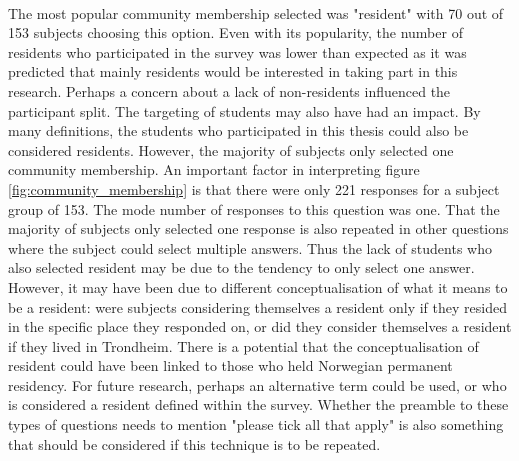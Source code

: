 \paragraph{}
The most popular community membership selected was "resident" with 70 out of 153 subjects choosing this option. Even with its popularity, the number of residents who participated in the survey was lower than expected as it was predicted that mainly residents would be interested in taking part in this research. Perhaps a concern about a lack of non-residents influenced the participant split. The targeting of students may also have had an impact. By many definitions, the students who participated in this thesis could also be considered residents. However, the majority of subjects only selected one community membership. An important factor in interpreting figure \ref{fig:community_membership} is that there were only 221 responses for a subject group of 153. The mode number of responses to this question was one. That the majority of subjects only selected one response is also repeated in other questions where the subject could select multiple answers. Thus the lack of students who also selected resident may be due to the tendency to only select one answer. However, it may have been due to different conceptualisation of what it means to be a resident: were subjects considering themselves a resident only if they resided in the specific place they responded on, or did they consider themselves a resident if they lived in Trondheim. There is a potential that the conceptualisation of resident could have been linked to those who held Norwegian permanent residency. For future research, perhaps an alternative term could be used, or who is considered a resident defined within the survey. Whether the preamble to these types of questions needs to mention "please tick all that apply" is also something that should be considered if this technique is to be repeated. 
\paragraph{}

